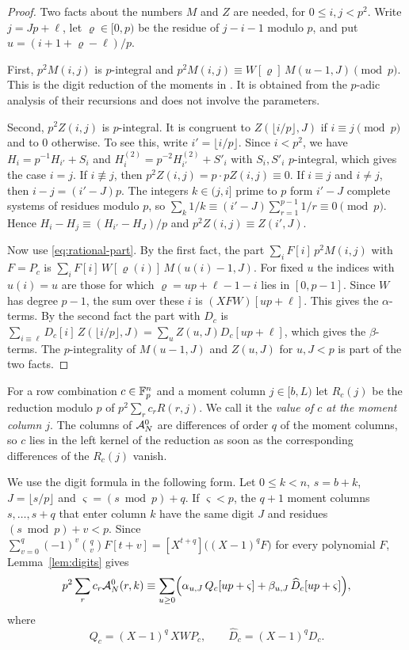 \begin{proof}
Two facts about the numbers $M$ and $Z$ are needed, for $0\le i,j<p^2$. Write $j=Jp+\ell$, let
$\varrho\in[0,p)$ be the residue of $j-i-1$ modulo $p$, and put $u=(i+1+\varrho-\ell)/p$.

First, $p^2M(i,j)$ is $p$-integral and $p^2M(i,j)\equiv W[\varrho]\,M(u-1,J)\pmod p$. This is the digit
reduction of the moments in \cite[\S3]{OpenAI2026}. It is obtained from the $p$-adic analysis of their
recursions and does not involve the parameters.

Second, $p^2Z(i,j)$ is $p$-integral. It is congruent to $Z(\lfloor i/p\rfloor,J)$ if $i\equiv j\pmod p$ and
to $0$ otherwise. To see this, write $i'=\lfloor i/p\rfloor$. Since $i<p^2$, we have $H_i=p^{-1}H_{i'}+S_i$
and $H^{(2)}_i=p^{-2}H^{(2)}_{i'}+S'_i$ with $S_i,S'_i$ $p$-integral, which gives the case $i=j$. If
$i\not\equiv j$, then $p^2Z(i,j)=p\cdot pZ(i,j)\equiv0$. If $i\equiv j$ and $i\ne j$, then $i-j=(i'-J)p$. The
integers $k\in(j,i]$ prime to $p$ form $i'-J$ complete systems of residues modulo $p$, so
$\sum_k1/k\equiv(i'-J)\sum_{r=1}^{p-1}1/r\equiv0\pmod p$. Hence $H_i-H_j\equiv(H_{i'}-H_J)/p$ and
$p^2Z(i,j)\equiv Z(i',J)$.

Now use \eqref{eq:rational-part}. By the first fact, the part $\sum_iF[i]\,p^2M(i,j)$ with $F=P_c$ is
$\sum_iF[i]\,W[\varrho(i)]\,M(u(i)-1,J)$. For fixed $u$ the indices with $u(i)=u$ are those for which
$\varrho=up+\ell-1-i$ lies in $[0,p-1]$. Since $W$ has degree $p-1$, the sum over these $i$ is
$(XFW)[up+\ell]$. This gives the $\alpha$-terms. By the second fact the part with $D_c$ is
$\sum_{i\equiv\ell}D_c[i]\,Z(\lfloor i/p\rfloor,J)=\sum_uZ(u,J)D_c[up+\ell]$, which gives the $\beta$-terms.
The $p$-integrality of $M(u-1,J)$ and $Z(u,J)$ for $u,J<p$ is part of the two facts.
\end{proof}

For a row combination $c\in\mathbb F_p^n$ and a moment column $j\in[b,L)$ let $R_c(j)$ be the reduction modulo
$p$ of $p^2\sum_rc_rR(r,j)$. We call it the \emph{value of $c$ at the moment column $j$}. The columns of
$\mathcal A^0_N$ are differences of order $q$ of the moment columns, so $c$ lies in the left kernel of the
reduction as soon as the corresponding differences of the $R_c(j)$ vanish.

We use the digit formula in the following form. Let $0\le k<n$, $s=b+k$, $J=\lfloor s/p\rfloor$ and
$\varsigma=(s\bmod p)+q$. If $\varsigma<p$, the $q+1$ moment columns $s,\dots,s+q$ that enter column $k$ have
the same digit $J$ and residues $(s\bmod p)+v<p$. Since
$\sum_{v=0}^q(-1)^v\binom qvF[t+v]=[X^{t+q}]\bigl((X-1)^qF\bigr)$ for every polynomial $F$,
Lemma~\ref{lem:digits} gives
\begin{equation}\label{eq:column-digits}
 p^2\sum_rc_r\mathcal A^0_N(r,k)\equiv\sum_{u\ge0}\Bigl(\alpha_{u,J}\,Q_c[up+\varsigma]+\beta_{u,J}\,\widehat D_c[up+\varsigma]\Bigr),
\end{equation}
where
\begin{equation}\label{eq:Qc}
 Q_c=(X-1)^q\,XWP_c,\qquad \widehat D_c=(X-1)^qD_c .
\end{equation}

